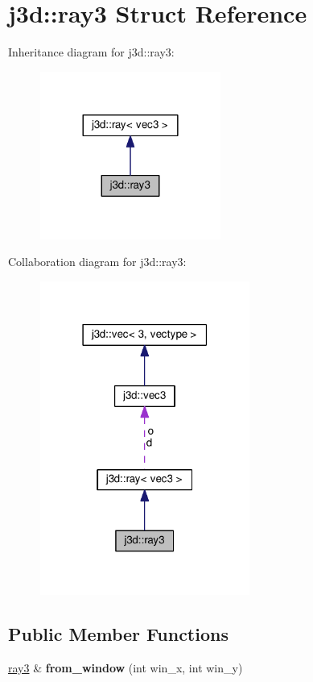 \hypertarget{structj3d_1_1ray3}{}\section{j3d\+:\+:ray3 Struct Reference}
\label{structj3d_1_1ray3}


Inheritance diagram for j3d\+:\+:ray3\+:
\nopagebreak
\begin{figure}[H]
\begin{center}
\leavevmode
\includegraphics[width=168pt]{structj3d_1_1ray3__inherit__graph}
\end{center}
\end{figure}


Collaboration diagram for j3d\+:\+:ray3\+:
\nopagebreak
\begin{figure}[H]
\begin{center}
\leavevmode
\includegraphics[width=195pt]{structj3d_1_1ray3__coll__graph}
\end{center}
\end{figure}
\subsection*{Public Member Functions}
\begin{DoxyCompactItemize}
\item 
\hypertarget{structj3d_1_1ray3_aa5238e8fac4d6bc809e300c37da66806}{}\hyperlink{structj3d_1_1ray3}{ray3} \& {\bfseries from\+\_\+window} (int win\+\_\+x, int win\+\_\+y)\label{structj3d_1_1ray3_aa5238e8fac4d6bc809e300c37da66806}

\end{DoxyCompactItemize}
